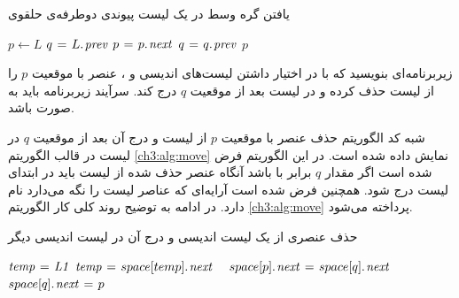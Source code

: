 \begin{algorithm}
\caption{یافتن گره وسط در یک لیست پیوندی دوطرفه‌ی حلقوی}\label{ch3:alg:findMiddle}
\begin{latin}
\begin{algorithmic}[1]
    \State    $p \gets L$
    \State    $q \mathrel{\hspace{1pt}=\hspace{1pt}} L.\hspace*{1pt}\mathit{prev}$
        \State    $p \mathrel{\hspace{1pt}=\hspace{1pt}} p.\hspace*{1pt}\mathit{next}$
        \State    $q \mathrel{\hspace{1pt}=\hspace{1pt}} q.\hspace*{1pt}\mathit{prev}$
    \EndWhile
    \State    \Return $p$
\EndFunction
\end{algorithmic}
\end{latin}
\end{algorithm}


 زیربرنامه‌ای بنویسید که با در اختیار داشتن لیست‌های اندیسی {} و {}، عنصر با موقعیت {$p$} را از لیست {} حذف کرده و در لیست {} بعد از موقعیت {$q$} درج کند. سرآیند زیربرنامه باید به صورت {} باشد.


شبه کد الگوریتم حذف عنصر با موقعیت {$p$} از لیست {} و درج آن بعد از موقعیت {$q$} در لیست {} در قالب الگوریتم {\eqref{ch3:alg:move}} نمایش داده شده است. در این الگوریتم فرض شده است اگر مقدار {$q$} برابر با {} باشد آنگاه عنصر حذف شده از لیست {} باید در ابتدای لیست {} درج شود. همچنین فرض شده است آرایه‌ای که عناصر لیست را نگه می‌دارد {} نام دارد. در ادامه به توضیح روند کلی کار الگوریتم {\eqref{ch3:alg:move}} پرداخته می‌شود.

\begin{algorithm}[H]
\caption{حذف عنصری از یک لیست اندیسی و درج آن در لیست اندیسی دیگر}\label{ch3:alg:move}
\begin{latin}
\begin{algorithmic}[1]
		\label{ch3:alg:line:mvOutIfBegin}
				\State	$\mathit{temp} \mathrel{\hspace{1pt}=\hspace{1pt}} \mathit{L1}$
				\label{ch3:alg:line:mvWhileBegin}
						\State	$\mathit{temp} \mathrel{\hspace{1pt}=\hspace{1pt}} space[temp].\hspace*{1pt}\mathit{next}$
				\EndWhile\ \label{ch3:alg:line:mvWhileEnd}
				\label{ch3:alg:mvInIf1Begin}
						\State	$space[p].\hspace*{1pt}\mathit{next} \mathrel{\hspace{1pt}=\hspace{1pt}} space[q].\hspace*{1pt}\mathit{next}$
						\State	$space[q].\hspace*{1pt}\mathit{next} \mathrel{\hspace{1pt}=\hspace{1pt}} p$
				\Else
\end{algorithmic}
\end{latin}
\end{algorithm}

